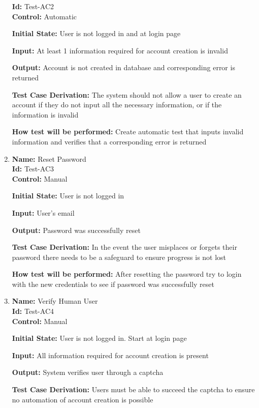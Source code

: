 \documentclass[12pt, titlepage]{article}
\begin{document}
\begin{enumerate}
\textbf{Id:} Test-AC2  \label{Test-AC2}\\

\textbf{Control: }Automatic
					
\textbf{Initial State:} User is not logged in and at login page
					
\textbf{Input:} At least 1 information required for account creation is invalid
					
\textbf{Output:} Account is not created in database and corresponding error is returned

\textbf{Test Case Derivation:} The system should not allow a user to create an account if they do not input all the necessary information, or if the information is invalid

\textbf{How test will be performed:} Create automatic test that inputs invalid information and verifies that a corresponding error is returned


\item{\textbf{Name:} Reset Password\\} \label{Test-AC3} %
\textbf{Id:} Test-AC3 \label{Test-AC3}\\

\textbf{Control:} Manual

\textbf{Initial State:} User is not logged in

\textbf{Input:} User's email

\textbf{Output:} Password was successfully reset

\textbf{Test Case Derivation:} In the event the user misplaces or forgets their password there needs to be a safeguard to ensure progress is not lost

\textbf{How test will be performed:} After resetting the password try to login with the new credentials to see if password was successfully reset


\item{\textbf{Name:} Verify Human User\\} %
\textbf{Id:} Test-AC4 \label{Test-AC4}\\

\textbf{Control: }Manual
					
\textbf{Initial State:} User is not logged in. Start at login page
					
\textbf{Input: }All information required for account creation is present
					
\textbf{Output: }System verifies user through a captcha

\textbf{Test Case Derivation: }Users must be able to succeed the captcha to ensure no automation of account creation is possible


\end{enumerate}
\end{document}
